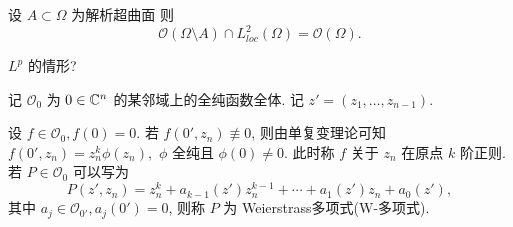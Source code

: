 \begin{theorem}[$L^2$-Riemann可去奇性定理* ]
  设 $A \subset \Omega $ 为解析超曲面 
  则 
  $$ \mathcal{O}(\Omega \setminus A) \cap L^2_{loc}(\Omega )=\mathcal{O}(\Omega ) .$$
\end{theorem}
\begin{exercise}
  $L^p$ 的情形? 
\end{exercise}


\begin{definition}
  记 $\mathcal{O}_0$ 为 $0 \in {\mathbb C}^n$ 的某邻域上的全纯函数全体. 记 $z'=(z_1,\dots,z_{n-1})$.  
\end{definition}

\begin{definition}
  设 $f \in \mathcal{O}_0, f(0)=0$. 若 $f(0',z_n) \not \equiv 0$, 则由单复变理论可知 $f(0',z_n)=z_n^k \phi (z_n), $ $\phi $ 全纯且 $\phi (0) \neq 0$. 此时称 $f$ 关于 $z_n$ 在原点 {\sffamily\small $k$ 阶正则}.    若 $P \in \mathcal{O}_0$ 可以写为 
  $$ P(z',z_n)=z_{n}^{k}+a_{k-1}(z')z_{n}^{k-1}+ \cdots +a_1(z')z_n+a_0(z') ,$$   
  其中 $a_j \in \mathcal{O}_{0'},a_j(0')=0$, 则称 $P$ 为 {\sffamily\small Weierstrass多项式(W-多项式)}.  
\end{definition}

